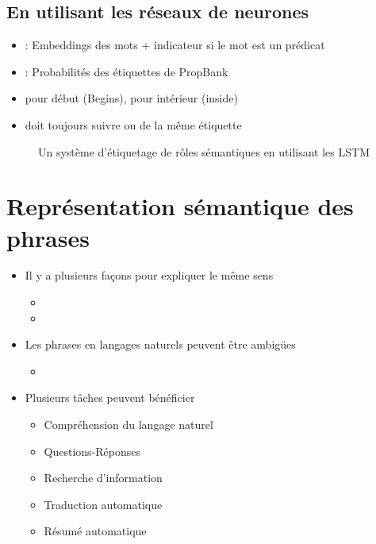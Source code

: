\documentclass{KodeBook}
\begin{document}
\subsection{En utilisant les réseaux de neurones}

\begin{minipage}{.48\textwidth}
	\begin{itemize}
		\item {} : Embeddings des mots + indicateur si le mot est un prédicat 
		\item {} : Probabilités des étiquettes de PropBank 
		\item {} pour début (Begins),  pour intérieur (inside)
		\item {} doit toujours suivre  ou  de la même étiquette
	\end{itemize}
\end{minipage}
\begin{figure}
	\caption{Un système d'étiquetage de rôles sémantiques en utilisant les LSTM \cite{2017-he-al}}
\end{figure}

\section{Représentation sémantique des phrases}

\begin{itemize}
	\item Il y a plusieurs façons pour expliquer le même sens
	\begin{itemize}
		\item {}
		\item {}
	\end{itemize}
	
	\item Les phrases en langages naturels peuvent être ambigües
	\begin{itemize}
		\item {}
	\end{itemize}
	
	\item Plusieurs tâches peuvent bénéficier 
	\begin{itemize}
		\item Compréhension du langage naturel
		\item Questions-Réponses
		\item Recherche d'information
		\item Traduction automatique
		\item Résumé automatique
	\end{itemize}
\end{itemize}
\end{document}
